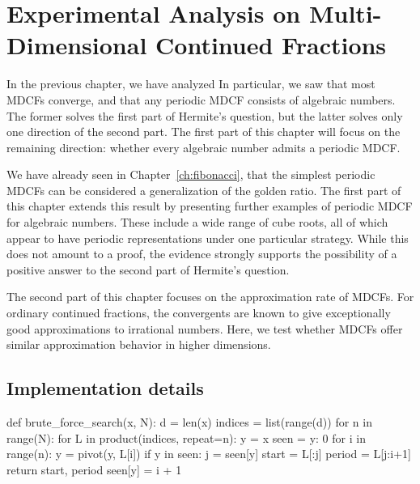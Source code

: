 \chapter{Experimental Analysis on Multi-Dimensional Continued Fractions}
\label{ch:implementation}

In the previous chapter, we have analyzed
In particular, we saw that most MDCFs converge,
and that any periodic MDCF consists of algebraic numbers.
The former solves the first part of Hermite's question, but the latter solves
only one direction of the second part.
The first part of this chapter will focus on the remaining direction:
whether every algebraic number admits a periodic MDCF.

We have already seen in Chapter~\ref{ch:fibonacci},
that the simplest periodic MDCFs can be considered a generalization of the
golden ratio.
The first part of this chapter extends this result by presenting further
examples of periodic MDCF for algebraic numbers.
These include a wide range of cube roots,
all of which appear to have periodic representations under one particular strategy.
While this does not amount to a proof, the evidence strongly supports
the possibility of a positive answer to the second part of Hermite’s question.

The second part of this chapter focuses on the approximation rate of MDCFs.
For ordinary continued fractions, the convergents are known to give
exceptionally good approximations to irrational numbers.
Here, we test whether MDCFs offer similar approximation behavior in higher dimensions.

\iffalse
\section{Implementation details}

\begin{Python}[
    float=tbp,
    numbers=left,
    label={lst:bfs},
    caption={
      The implementation of the brute-force search for finding a periodic representation.
      The program iterates over all sequences with a maximum length of $N$
      until it finds a duplicate vector.
    }
  ]
def brute_force_search(x, N):
  d = len(x)
  indices = list(range(d))
  for n in range(N):
    for L in product(indices, repeat=n):
      y = x
      seen = {y: 0}
      for i in range(n):
        y = pivot(y, L[i])
        if y in seen:
          j = seen[y]
          start = L[:j]
          period = L[j:i+1]
          return start, period
        seen[y] = i + 1
\end{Python}

